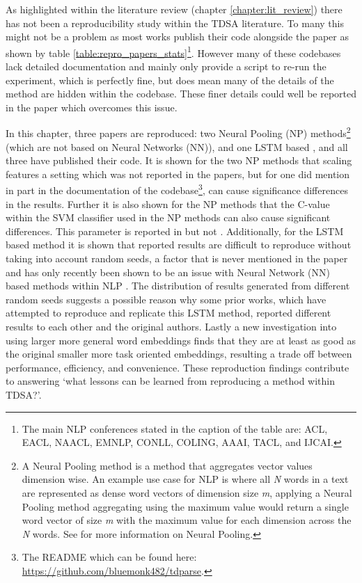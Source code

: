 As highlighted within the literature review (chapter \ref{chapter:lit_review}) there has not been a reproducibility study within the TDSA literature. To many this might not be a problem as most works publish their code alongside the paper as shown by table \ref{table:repro_papers_stats}\footnote{The main NLP conferences stated in the caption of the table are: ACL, EACL, NAACL, EMNLP, CONLL, COLING, AAAI, TACL, and IJCAI.}. However many of these codebases lack detailed documentation and mainly only provide a script to re-run the experiment, which is perfectly fine, but does mean many of the details of the method are hidden within the codebase. These finer details could well be reported in the paper which overcomes this issue. 

In this chapter, three papers are reproduced: two Neural Pooling (NP) methods\footnote{A Neural Pooling method is a method that aggregates vector values dimension wise. An example use case for NLP is where all \textit{N} words in a text are represented as dense word vectors of dimension size \textit{m}, applying a Neural Pooling method aggregating using the maximum value would return a single word vector of size \textit{m} with the maximum value for each dimension across the \textit{N} words. See \citet{vo2015target} for more information on Neural Pooling.} \citep{vo2015target, wang-etal-2017-tdparse} (which are not based on Neural Networks (NN)), and one LSTM based \citep{tang-etal-2016-effective}, and all three have published their code. It is shown for the two NP methods that scaling features a setting which was not reported in the papers, but for one \citep{wang-etal-2017-tdparse} did mention in part in the documentation of the codebase\footnote{The README which can be found here: \url{https://github.com/bluemonk482/tdparse}.}, can cause significance differences in the results. Further it is also shown for the NP methods that the C-value within the SVM classifier used in the NP methods can also cause significant differences. This parameter is reported in \citet{vo2015target} but not \citet{wang-etal-2017-tdparse}. Additionally, for the LSTM based method it is shown that reported results are difficult to reproduce without taking into account random seeds, a factor that is never mentioned in the paper and has only recently been shown to be an issue with Neural Network (NN) based methods within NLP \citep{reimers-gurevych-2017-reporting}. The distribution of results generated from different random seeds suggests a possible reason why some prior works, which have attempted to reproduce \citep{tay2018learning} and replicate \citep{chen-etal-2017-recurrent} this LSTM method, reported different results to each other and the original authors. Lastly a new investigation into using larger more general word embeddings finds that they are at least as good as the original smaller more task oriented embeddings, resulting a trade off between performance, efficiency, and convenience. These reproduction findings contribute to answering  `what lessons can be learned from reproducing a method within TDSA?'.


